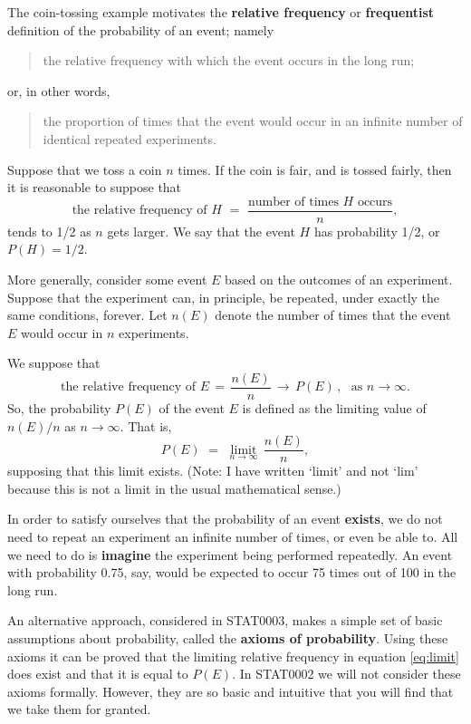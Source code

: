 \documentclass[
  british,
]{book}
\begin{document}
The coin-tossing example motivates the \textbf{relative frequency} or \textbf{frequentist} definition of the probability of an event; namely

\begin{quote}
the relative frequency with which the event occurs in the long run;
\end{quote}

or, in other words,

\begin{quote}
the proportion of times that the event would occur in an infinite number of identical repeated experiments.
\end{quote}

Suppose that we toss a coin \(n\) times. If the coin is fair, and is tossed fairly, then it is reasonable to suppose that
\[\mbox{the relative frequency of $H$} \,\,=\,\, 
\frac{\mbox{number of times $H$ occurs}}{n},\]
tends to 1/2 as \(n\) gets larger. We say that the event \(H\) has probability 1/2, or \(P(H)=1/2\).

More generally, consider some event \(E\) based on the outcomes of an experiment. Suppose that the experiment can, in principle, be repeated, under exactly the same conditions, forever. Let \(n(E)\) denote the number of times that the event \(E\) would occur in \(n\) experiments.

We suppose that
\[\mbox{the relative frequency of $E$} \,=\,
\frac{n(E)}{n} \,\longrightarrow\, P(E)\,, \,\, \mbox{~as~}n \longrightarrow \infty.\]
So, the probability \(P(E)\) of the event \(E\) is defined as the limiting value of \(n(E)/n\) as \(n \rightarrow \infty\). That is,
\begin{equation}
P(E) \,\,=\,\, \mathop \mathrm{limit}\limits_{n \rightarrow \infty}\,\frac{n(E)}{n},
\label{eq:limit}
\end{equation}
supposing that this limit exists. (Note: I have written `limit' and not `lim' because this is not a limit in the usual mathematical sense.)

In order to satisfy ourselves that the probability of an event \textbf{exists}, we do not need to repeat an experiment an infinite number of times, or even be able to. All we need to do is \textbf{imagine} the experiment being performed repeatedly. An event with probability 0.75, say, would be expected to occur 75 times out of 100 in the long run.

An alternative approach, considered in STAT0003, makes a simple set of basic assumptions about probability, called the \textbf{axioms of probability}. Using these axioms it can be proved that the limiting relative frequency in equation \eqref{eq:limit} does exist and that it is equal to \(P(E)\). In STAT0002 we will not consider these axioms formally. However, they are so basic and intuitive that you will find that we take them for granted.
\end{document}
